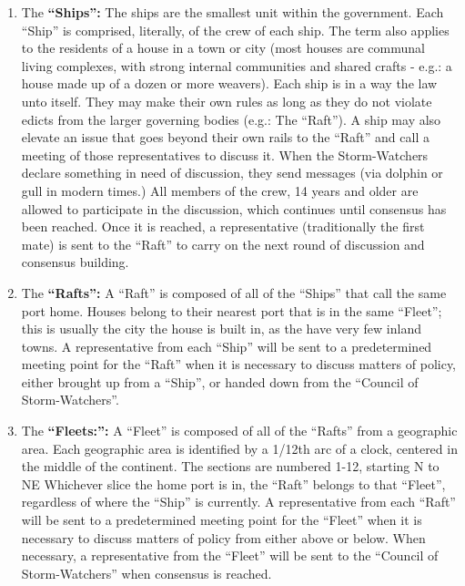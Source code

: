 \documentclass[blue]{GL2020}
\begin{document}
\begin{enumerate}	
	\item The {\bf``Ships'':} The ships are the smallest unit within the \pShip{} government. Each ``Ship'' is comprised, literally, of the crew of each ship. The term also applies to the residents of a house in a town or city (most \pShip{} houses are communal living complexes, with strong internal communities and shared crafts - e.g.: a house made up of a dozen or more weavers). Each ship is in a way the law unto itself. They may make their own rules as long as they do not violate edicts from the larger governing bodies (e.g.: The ``Raft''). A ship may also elevate an issue that goes beyond their own rails to the ``Raft'' and call a meeting of those representatives to discuss it. When the Storm-Watchers declare something in need of discussion, they send messages (via dolphin or gull in modern times.) All members of the crew, 14 years and older are allowed to participate in the discussion, which continues until consensus has been reached. Once it is reached, a representative (traditionally the first mate) is sent to the ``Raft'' to carry on the next round of discussion and consensus building.
		\item The {\bf ``Rafts'':} A ``Raft'' is composed of all of the ``Ships'' that call the same port home. Houses belong to their nearest port that is in the same ``Fleet''; this is usually the city the house is built in, as the \pShippies{} have very few inland towns. A representative from each ``Ship'' will be sent to a predetermined meeting point for the ``Raft'' when it is necessary to discuss matters of policy, either brought up from a ``Ship'', or handed down from the ``Council of Storm-Watchers''.
		\item The {\bf``Fleets:'':} A ``Fleet'' is composed of all of the ``Rafts'' from a geographic area. Each geographic area is identified by a 1/12th arc of a clock, centered in the middle of the continent. The sections are numbered 1-12, starting N to NE Whichever slice the home port is in, the ``Raft'' belongs to that ``Fleet'', regardless of where the ``Ship'' is currently. A representative from each ``Raft'' will be sent to a predetermined meeting point for the ``Fleet'' when it is necessary to discuss matters of policy from either above or below. When necessary, a representative from the ``Fleet'' will be sent to the ``Council of Storm-Watchers'' when consensus is reached.

\end{enumerate}
\end{document}
